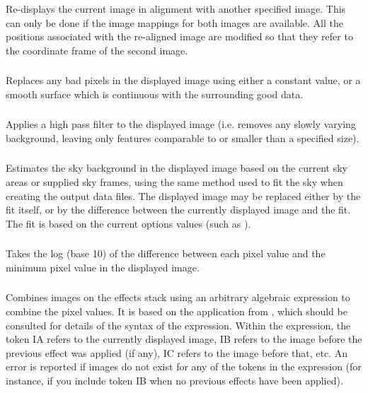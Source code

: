\subsubsection { } 
Re-displays the current image in alignment with another specified image.
This can only be done if the image mappings for both images are
available. All the positions associated with the re-aligned image are
modified so that they refer to the coordinate frame of the second image.

\subsubsection { }
Replaces any bad pixels in the displayed image using either a constant 
value, or a smooth surface which is continuous with the surrounding good
data.

\subsubsection { } 
Applies a high pass filter to the displayed image (i.e. removes any
slowly varying background, leaving only features comparable to or smaller
than a specified size). 

\subsubsection { } 
Estimates the sky background in the displayed image based on the current
sky areas or supplied sky frames, using the same method used to fit the
sky when creating the output data files. The displayed image may be
replaced either by the fit itself, or by the difference between the
currently displayed image and the fit. The fit is based on the current
options values (such as ). 

\subsubsection { } 
Takes the log (base 10) of the difference between each pixel value and the
minimum pixel value in the displayed image.

\subsubsection { } 
Combines images on the effects stack using an arbitrary algebraic expression 
to combine the pixel values. It is based on the  
application from , which should be consulted for 
details of the syntax of the expression. Within the expression, the token IA 
refers to the currently displayed image, IB refers to the image before
the previous effect was applied (if any), IC refers to the image before
that, etc. An error is reported if images do not exist for any of the
tokens in the expression (for instance, if you include token IB when no
previous effects have been applied). 

